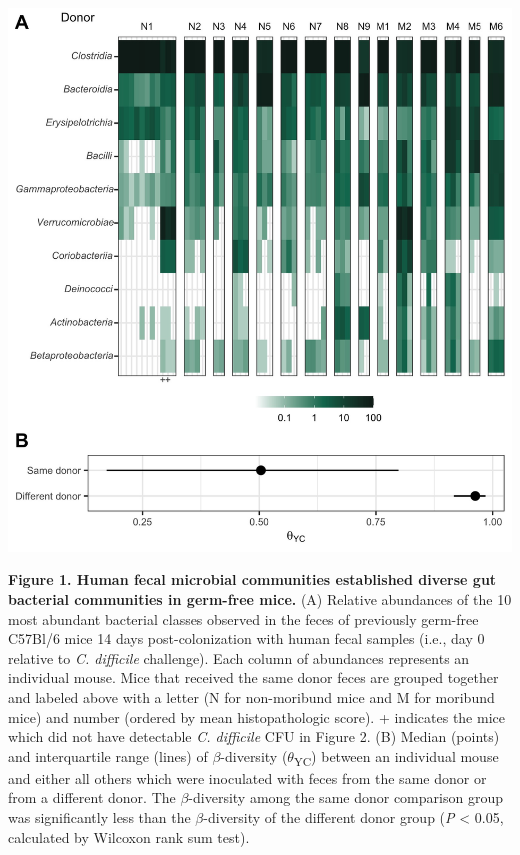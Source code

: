 \documentclass[
  12pt,
]{article}
\begin{document}
\includegraphics{../results/figures/figure_1.jpg}

\textbf{Figure 1. Human fecal microbial communities established diverse
gut bacterial communities in germ-free mice.} (A) Relative abundances of
the 10 most abundant bacterial classes observed in the feces of
previously germ-free C57Bl/6 mice 14 days post-colonization with human
fecal samples (i.e., day 0 relative to \emph{C. difficile} challenge).
Each column of abundances represents an individual mouse. Mice that
received the same donor feces are grouped together and labeled above
with a letter (N for non-moribund mice and M for moribund mice) and
number (ordered by mean histopathologic score). + indicates the mice
which did not have detectable \emph{C. difficile} CFU in Figure 2. (B)
Median (points) and interquartile range (lines) of \(\beta\)-diversity
(\(\theta\)\textsubscript{YC}) between an individual mouse and either
all others which were inoculated with feces from the same donor or from
a different donor. The \(\beta\)-diversity among the same donor
comparison group was significantly less than the \(\beta\)-diversity of
the different donor group (\emph{P} \textless{} 0.05, calculated by
Wilcoxon rank sum test).

\hfill\break
\end{document}
